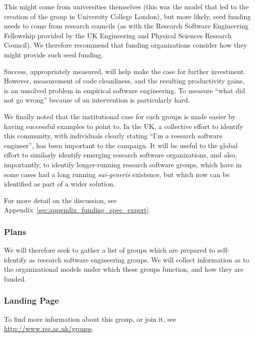 This might come from universities themselves (this was the model that led to the
creation of the group in University College London), but more likely, seed
funding needs to come from research councils (as with the Research Software
Engineering Fellowship provided by the UK Engineering and Physical Sciences
Research Council). We therefore recommend that funding organizations consider
how they might provide such seed funding.

Success, appropriately measured, will help make the case for further investment.
However, measurement of code cleanliness, and the resulting productivity gains,
is an unsolved problem in empirical software engineering. To measure
``what did not go wrong'' because of an intervention is particularly hard.

We finally noted that the institutional case for such groups is made easier
by having successful examples to point to. In the UK, a collective effort to
identify this community, with individuals clearly stating ``I'm a research
software engineer'', has been important to the campaign. It will be useful to
the global effort to similarly identify emerging research software organizations,
and also, importantly, to identify longer-running research software groups,
which have in some cases had a long running \emph{sui-generis} existence, but which
now can be identified as part of a wider solution.

For more detail on the discussion, see Appendix~\ref{sec:appendix_funding_spec_expert}.

\subsubsection{Plans}

We will therefore seek to gather a list of groups which are prepared to
self-identify as research software engineering groups. We will collect information
as to the organizational models under which these groups function, and how they
are funded.

\subsubsection{Landing Page}

To find more information about this group, or join it, see \url{http://www.rse.ac.uk/groups}.
